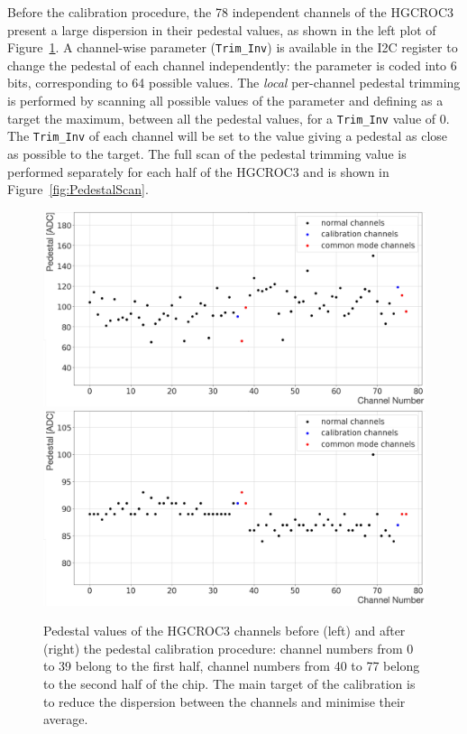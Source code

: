 \bigbreak

Before the calibration procedure, the 78 independent channels of the HGCROC3 present a large dispersion in their pedestal values, as shown in the left plot of Figure~\ref{fig:Pedestal}. 
A channel-wise parameter (\texttt{Trim\_Inv}) is available in the I2C register to change the pedestal of each channel independently: the parameter is coded into 6 bits, corresponding to 64 possible values.
The \textit{local} per-channel pedestal trimming is performed by scanning all possible values of the parameter and defining as a target the maximum, between all the pedestal values, for a \texttt{Trim\_Inv} value of 0. The \texttt{Trim\_Inv} of each channel will be set to the value giving a pedestal as close as possible to the target.
The full scan of the pedestal trimming value is performed separately for each half of the HGCROC3 and is shown in Figure~\ref{fig:PedestalScan}.

\begin{figure}
    \centering
    \includegraphics[width=0.49\linewidth]{Figures/HGCAL/Pedestal_0.pdf}
    \includegraphics[width=0.49\linewidth]{Figures/HGCAL/Pedestal_1.pdf}
    \caption{Pedestal values of the HGCROC3 channels before (left) and after (right) the pedestal calibration procedure: channel numbers from 0 to 39 belong to the first half, channel numbers from 40 to 77 belong to the second half of the chip. The main target of the calibration is to reduce the dispersion between the channels and minimise their average.}
    \label{fig:Pedestal}
\end{figure}

